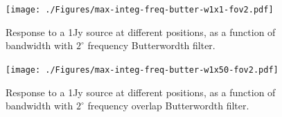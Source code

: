 \documentclass[useAMS,usenatbib]{mn2e}
\begin{document}
\begin{figure}
\begin{minipage}{0.38\linewidth}\texttt{[image: ./Figures/max-integ-freq-butter-w1x1-fov2.pdf]}
      \caption{Response to a 1Jy source at different positions, as a function of bandwidth with $2^{\circ}$ frequency Butterwordth filter.}
      \label{fig:max-integ-freq-butter-w1x1-fov2}
      \end{minipage}
\hspace{1cm}
\begin{minipage}{0.38\linewidth}\texttt{[image: ./Figures/max-integ-freq-butter-w1x50-fov2.pdf]}
      \caption{Response to a 1Jy source at different positions, as a function of bandwidth with $2^{\circ}$ frequency overlap Butterwordth 
filter.}
      \label{fig:max-integ-freq-butter-w1x50-fov2}
      \end{minipage}
\end{figure}
\end{document}
